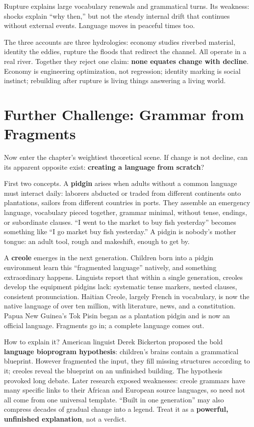 Rupture explains large vocabulary renewals and grammatical turns. Its weakness: shocks explain ``why then,'' but not the steady internal drift that continues without external events. Language moves in peaceful times too.

The three accounts are three hydrologies: economy studies riverbed material, identity the eddies, rupture the floods that redirect the channel. All operate in a real river. Together they reject one claim: \textbf{none equates change with decline}. Economy is engineering optimization, not regression; identity marking is social instinct; rebuilding after rupture is living things answering a living world.

\section{Further Challenge: Grammar from Fragments}
Now enter the chapter's weightiest theoretical scene. If change is not decline, can its apparent opposite exist: \textbf{creating a language from scratch}?

First two concepts. A \textbf{pidgin} arises when adults without a common language must interact daily: laborers abducted or traded from different continents onto plantations, sailors from different countries in ports. They assemble an emergency language, vocabulary pieced together, grammar minimal, without tense, endings, or subordinate clauses. ``I went to the market to buy fish yesterday'' becomes something like ``I go market buy fish yesterday.'' A pidgin is nobody's mother tongue: an adult tool, rough and makeshift, enough to get by.

A \textbf{creole} emerges in the next generation. Children born into a pidgin environment learn this ``fragmented language'' natively, and something extraordinary happens. Linguists report that within a single generation, creoles develop the equipment pidgins lack: systematic tense markers, nested clauses, consistent pronunciation. Haitian Creole, largely French in vocabulary, is now the native language of over ten million, with literature, news, and a constitution. Papua New Guinea's Tok Pisin began as a plantation pidgin and is now an official language. Fragments go in; a complete language comes out.

How to explain it? American linguist Derek Bickerton proposed the bold \textbf{language bioprogram hypothesis}: children's brains contain a grammatical blueprint. However fragmented the input, they fill missing structures according to it; creoles reveal the blueprint on an unfinished building. The hypothesis provoked long debate. Later research exposed weaknesses: creole grammars have many specific links to their African and European source languages, so need not all come from one universal template. ``Built in one generation'' may also compress decades of gradual change into a legend. Treat it as a \textbf{powerful, unfinished explanation}, not a verdict.

